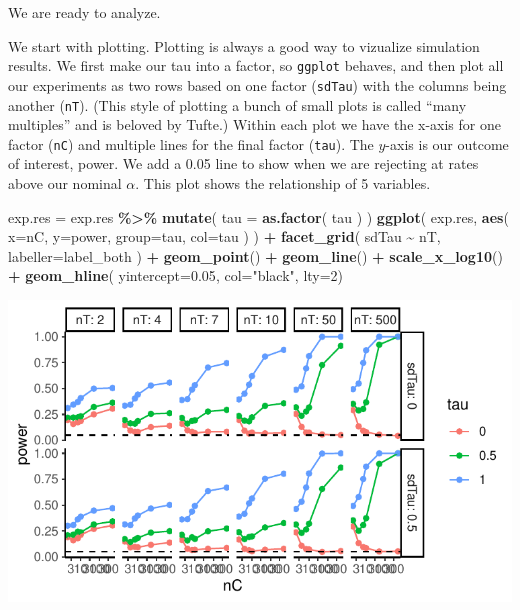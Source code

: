 \documentclass[
]{book}
\newenvironment{Shaded}{\begin{snugshade}}{\end{snugshade}}
\newcommand{\AttributeTok}[1]{\textcolor[rgb]{0.13,0.29,0.53}{#1}}
\newcommand{\DecValTok}[1]{\textcolor[rgb]{0.00,0.00,0.81}{#1}}
\newcommand{\FloatTok}[1]{\textcolor[rgb]{0.00,0.00,0.81}{#1}}
\newcommand{\FunctionTok}[1]{\textcolor[rgb]{0.13,0.29,0.53}{\textbf{#1}}}
\newcommand{\NormalTok}[1]{#1}
\newcommand{\OtherTok}[1]{\textcolor[rgb]{0.56,0.35,0.01}{#1}}
\newcommand{\SpecialCharTok}[1]{\textcolor[rgb]{0.81,0.36,0.00}{\textbf{#1}}}
\newcommand{\StringTok}[1]{\textcolor[rgb]{0.31,0.60,0.02}{#1}}
\begin{document}
We are ready to analyze.

We start with plotting.
Plotting is always a good way to vizualize simulation results.
We first make
our tau into a factor, so \texttt{ggplot} behaves, and then plot all our
experiments as two rows based on one factor (\texttt{sdTau}) with the columns being
another (\texttt{nT}). (This style of plotting a bunch of small plots is called
``many multiples'' and is beloved by Tufte.) Within each plot we have the
x-axis for one factor (\texttt{nC}) and multiple lines for the final factor (\texttt{tau}).
The \(y\)-axis is our outcome of interest, power. We add a 0.05 line to show
when we are rejecting at rates above our nominal \(\alpha\). This plot shows
the relationship of 5 variables.

\begin{Shaded}
\begin{Highlighting}[]
\NormalTok{exp.res }\OtherTok{=}\NormalTok{ exp.res }\SpecialCharTok{\%\textgreater{}\%} \FunctionTok{mutate}\NormalTok{( }\AttributeTok{tau =} \FunctionTok{as.factor}\NormalTok{( tau ) )}
\FunctionTok{ggplot}\NormalTok{( exp.res, }\FunctionTok{aes}\NormalTok{( }\AttributeTok{x=}\NormalTok{nC, }\AttributeTok{y=}\NormalTok{power, }\AttributeTok{group=}\NormalTok{tau, }\AttributeTok{col=}\NormalTok{tau ) ) }\SpecialCharTok{+}
  \FunctionTok{facet\_grid}\NormalTok{( sdTau }\SpecialCharTok{\textasciitilde{}}\NormalTok{ nT, }\AttributeTok{labeller=}\NormalTok{label\_both ) }\SpecialCharTok{+}
  \FunctionTok{geom\_point}\NormalTok{() }\SpecialCharTok{+} \FunctionTok{geom\_line}\NormalTok{() }\SpecialCharTok{+}
  \FunctionTok{scale\_x\_log10}\NormalTok{() }\SpecialCharTok{+}
  \FunctionTok{geom\_hline}\NormalTok{( }\AttributeTok{yintercept=}\FloatTok{0.05}\NormalTok{, }\AttributeTok{col=}\StringTok{"black"}\NormalTok{, }\AttributeTok{lty=}\DecValTok{2}\NormalTok{)}
\end{Highlighting}
\end{Shaded}

\begin{center}\includegraphics[width=0.75\linewidth]{Designing-Simulations-in-R_files/figure-latex/unnamed-chunk-162-1} \end{center}
\end{document}
